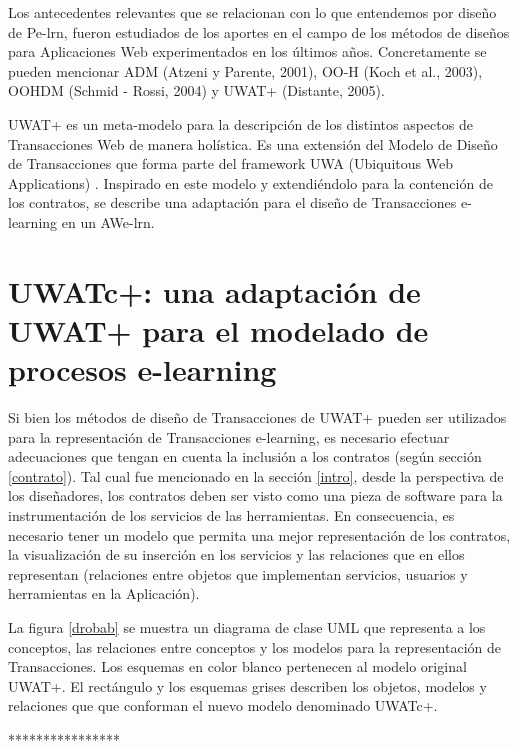 Los antecedentes relevantes que se relacionan con lo que entendemos por diseño
de Pe-lrn, fueron estudiados de los aportes en el campo de los métodos de
diseños para Aplicaciones Web experimentados en los últimos años. Concretamente
se pueden mencionar ADM (Atzeni y Parente, 2001), OO-H (Koch et al., 2003),
OOHDM (Schmid - Rossi, 2004) y UWAT+ (Distante, 2005).

UWAT+ es un meta-modelo para la descripción de los distintos aspectos de
Transacciones Web de manera holística. Es una extensión del Modelo de Diseño de
Transacciones que forma  parte del framework UWA (Ubiquitous Web Applications)
\cite{UWA}. Inspirado en este modelo y extendiéndolo para la contención de los
contratos, se describe una adaptación para el diseño de Transacciones e-learning
en un AWe-lrn.

\section {UWATc+: una adaptación de UWAT+ para el modelado de procesos
e-learning} \label{uwatc}

Si bien los métodos de diseño de Transacciones de UWAT+ pueden ser utilizados
para la representación de Transacciones e-learning, es necesario efectuar
adecuaciones que tengan en cuenta la inclusión a los contratos (según sección
\ref{contrato}). Tal cual fue mencionado en la sección \ref{intro}, desde la
perspectiva de los diseñadores, los contratos deben ser visto como una pieza de
software para la instrumentación de los servicios de las herramientas. En
consecuencia, es necesario tener un modelo que permita una mejor representación
de los contratos, la visualización de su inserción en los servicios y las
relaciones que en ellos representan (relaciones entre objetos que implementan
servicios, usuarios y herramientas en la Aplicación). 


La figura \ref{drobab} se muestra un diagrama de clase UML que representa a los
conceptos, las relaciones entre conceptos y los modelos para la representación
de Transacciones. Los esquemas en color blanco pertenecen al modelo original
UWAT+. El rectángulo y los esquemas grises describen los objetos, modelos y
relaciones que  que conforman el nuevo modelo denominado UWATc+.

****************

